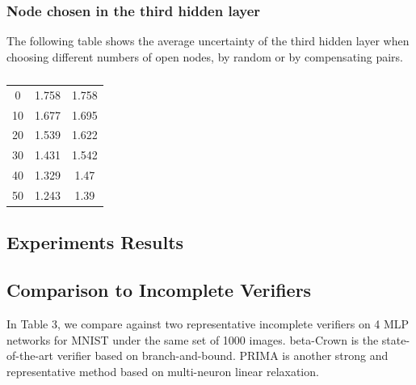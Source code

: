 \documentclass{llncs}
\begin{document}
\subsubsection*{Node chosen in the third hidden layer}

The following table shows the average uncertainty of the third hidden layer when choosing different numbers of open nodes, by random or by compensating pairs.


\begin{table}
	\centering
	\begin{tabular}{c|c|c}
	
	\text{Number of open nodes}  &  \text{Compensating} & \text{Random}  \\ \hline
	0  &  1.758 & 1.758  \\ \hline
	10  &  1.677 & 1.695  \\ \hline
	20  &  1.539 & 1.622  \\ \hline
	30  &  1.431 & 1.542  \\ \hline
	40  &  1.329 & 1.47  \\ \hline
	50  &  1.243 & 1.39  \\ \hline
\end{tabular}
\caption{}
\label{tab:example1}
\end{table}



\subsection{Experiments Results}






\subsection{Comparison to Incomplete Verifiers}

In Table 3, we compare against two representative incomplete
verifiers on 4 MLP networks for MNIST under the same
set of 1000 images. beta-Crown is the state-of-the-art verifier based on branch-and-bound. PRIMA is another strong and representative method based on multi-neuron linear relaxation.
\end{document}
